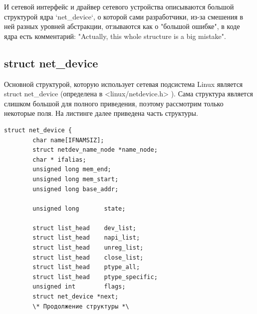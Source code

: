 \documentclass[14pt, a4paper]{extarticle}
\begin{document}
И сетевой интерфейс и драйвер сетевого устройства описываются большой структурой ядра `net\_device`, о которой сами разработчики, из-за смешения в ней разных уровней абстракции, отзываются как о "большой ошибке", в коде ядра есть комментарий: "Actually, this whole structure is a big mistake".



\subsection{struct net\_device}
Основной структурой, которую использует сетевая подсистема Linux является struct net\_device (определена в <linux/netdevice.h> \cite{netdevice}). Сама структура является слишком большой для полного приведения, поэтому рассмотрим только некоторые поля.
На листинге далее приведена часть структуры.
\begin{lstlisting}[caption=net\_device]
	struct net_device {
		char name[IFNAMSIZ];
		struct netdev_name_node	*name_node;
		char * ifalias;
		unsigned long mem_end;
		unsigned long mem_start;
		unsigned long base_addr;
		
		unsigned long		state;
		
		struct list_head	dev_list;
		struct list_head	napi_list;
		struct list_head	unreg_list;
		struct list_head	close_list;
		struct list_head	ptype_all;
		struct list_head	ptype_specific;
		unsigned int		flags;
		struct net_device *next;
		\* Продолжение структуры *\
\end{lstlisting}
\end{document}
